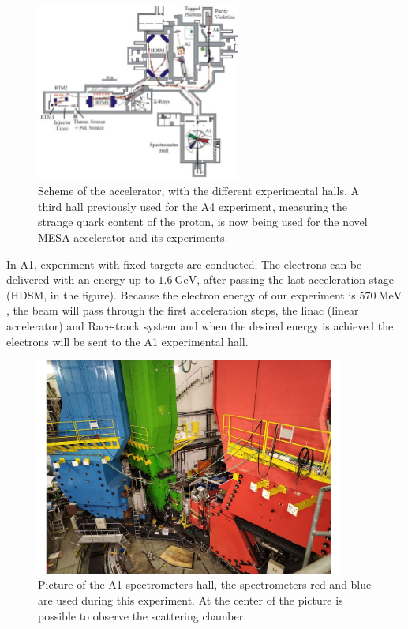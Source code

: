 \begin{figure}[hbtp]
\centering
\includegraphics[width = 0.6\textwidth]{ExperimentalSetup/Accelerator.pdf}
\caption{Scheme of the accelerator, with the different experimental halls. A third hall previously used for the A4 experiment, measuring the strange quark content of the proton, is now being used for the novel MESA accelerator and its experiments.}
\label{fig:Accelerator}
\end{figure}

In A1, experiment with fixed targets are conducted. The electrons can be delivered with an energy up to $\SI{1.6}{\giga \electronvolt}$, after passing the last acceleration stage (HDSM, in the figure). Because the electron energy of our experiment is $\SI{570}{\mega \electronvolt}$, the beam will pass through the first acceleration steps, the linac (linear accelerator) and Race-track system and when the desired energy is achieved the electrons will be sent to the A1 experimental hall. 

\begin{figure}[!h]
\centering
\includegraphics[width = 0.9\textwidth]{figures/twoSpektrometer.pdf}
\caption{Picture of the A1 spectrometers hall, the spectrometers red and blue are used during this experiment. At the center of the picture is possible to observe the scattering chamber.}
\label{fig:TwoSpektr}
\end{figure}

